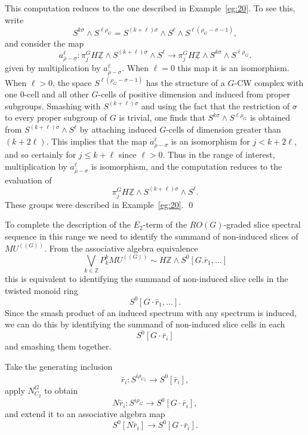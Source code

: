\documentclass{amsart}
\theoremstyle{definition}
\theoremstyle{remark}
\newenvironment{pf}{\bigskip{\em Proof:\/}}{\qed\medskip}
\newcommand{\Z}{{\mathbb Z}}
\newcommand{\mutn}[1]{MU^{(\!(#1)\!)}}
\newcommand{\slc}[2]{P_{#1}^{#1}#2}
\newcommand{\norm}{N}
\newcommand{\Zm}{\underline{\Z}}
\newcommand{\gbar}{\bar}
\newcommand{\rr}{\gbar{r}}
\newcommand{\zt}{C_{2}}
\begin{document}
\begin{pf}
This computation reduces to the one described in Example~\ref{eg:20}.
To see this, write 
\[
S^{k\sigma}\wedge S^{\ell\rho_{G}} = 
S^{(k+\ell)\sigma}\wedge S^{\ell}\wedge S^{\ell(\rho_{G}-\sigma-1)}, 
\]
and consider the map
\begin{equation}
\label{eq:115}
a_{\bar{\rho}-\sigma}^{\ell}:\pi^{G}_{j} H\Zm\wedge S^{(k+\ell)\sigma}\wedge S^{\ell}
\to 
\pi^{G}_{j} H\Zm\wedge S^{k\sigma}\wedge S^{\ell\rho_{G}}.
\end{equation}
given by multiplication by $a_{\bar{\rho}-\sigma}^{\ell}$.  When
$\ell=0$ this map it is an isomorphism.  When $\ell>0$, the space
$S^{\ell(\rho_{G}-\sigma-1)}$ has the structure of a $G$-CW complex
with one $0$-cell and all other $G$-cells of positive dimension and
induced from proper subgroups.  Smashing with $S^{(k+\ell)\sigma}$ and
using the fact that the restriction of $\sigma$ to every proper
subgroup of $G$ is trivial, one finds that $S^{k\sigma}\wedge
S^{\ell\rho_{G}}$ is obtained from $S^{(k+\ell)\sigma}\wedge S^{\ell}$
by attaching induced $G$-cells of dimension greater than $(k+2\ell)$.
This implies that the map $a_{\bar{\rho}-\sigma}^{\ell}$ is an
isomorphism for $j<k+2\ell$, and so certainly for $j\le k+\ell$ since
$\ell>0$.  Thus in the range of interest, multiplication by
$a_{\bar{\rho}-\sigma}^{\ell}$ is isomorphism, and the computation
reduces to the evaluation of
\[
\pi^{G}_{j}
H\Zm\wedge S^{(k+\ell)\sigma}\wedge S^{\ell}.
\]
These groups were described in Example~\ref{eg:20}.
\end{pf}



To complete the description of the $E_{2}$-term of the $RO(G)$-graded
slice spectral sequence in this range we need to identify the summand
of non-induced slices of $\mutn{G}$.  From the associative algebra
equivalence
\[
\bigvee_{k\in\Z} \slc{k}{\mutn{G}} \sim H\Z\wedge S^{0}[G.\rr_{1},\dots]
\]
this is equivalent to identifying the summand of non-induced slice
cells in the twisted monoid ring
\[
S^{0}[G\cdot\rr_{1},\dots].
\]
Since the smash product of an induced spectrum with any spectrum is
induced, we can do this by identifying the summand of non-induced
slice cells in each
\[
S^{0}[G\cdot\rr_{i}]
\]
and smashing them together.   

Take the generating inclusion 
\[
\rr_{i}:S^{i\rho_{\zt}} \to S^{0}[\rr_{i}],
\]
apply $\norm_{\zt}^{G}$ to obtain 
\[
\norm\rr_{i}:S^{i\rho_{G}}\to S^{0}[G\cdot\rr_{i}],
\]
and extend it to an associative algebra map 
\begin{equation}
\label{eq:101}
S^{0}[\norm\rr_{i} ]\to S^{0}[G\cdot\rr_{i}].
\end{equation}
\end{document}

